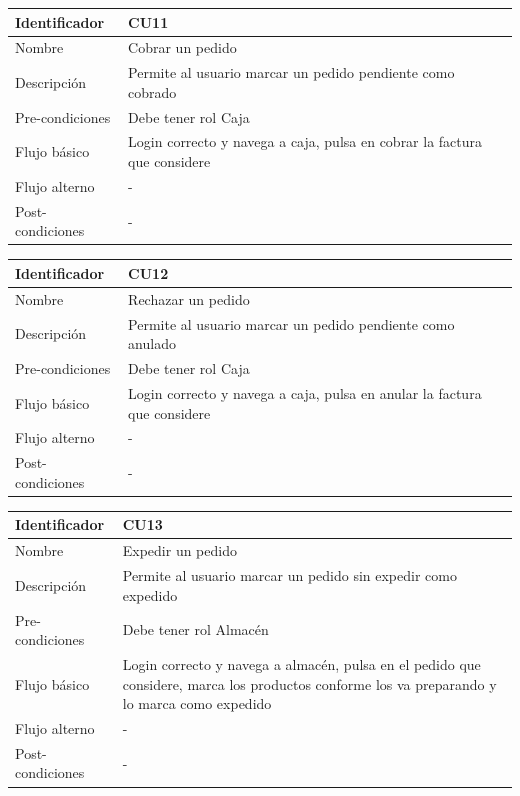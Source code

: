 \vspace{1em}
\par
\begin{tabular}{||p{3cm}|p{11cm}||} 
\hline
Identificador & CU11 \\ [0.5ex] 
\hline\hline
Nombre & Cobrar un pedido \\ 
\hline
Descripción & Permite al usuario marcar un pedido pendiente como cobrado \\
\hline
Pre-condiciones & Debe tener rol Caja \\
\hline
Flujo básico & Login correcto y navega a caja, pulsa en cobrar la factura que considere \\
\hline
Flujo alterno & - \\
\hline
Post-condiciones & - \\
\hline
\end{tabular}

\vspace{1em}
\par
\begin{tabular}{||p{3cm}|p{11cm}||} 
\hline
Identificador & CU12 \\ [0.5ex] 
\hline\hline
Nombre & Rechazar un pedido \\ 
\hline
Descripción & Permite al usuario marcar un pedido pendiente como anulado \\
\hline
Pre-condiciones & Debe tener rol Caja \\
\hline
Flujo básico & Login correcto y navega a caja, pulsa en anular la factura que considere \\
\hline
Flujo alterno & - \\
\hline
Post-condiciones & - \\
\hline
\end{tabular}

\vspace{1em}
\par
\begin{tabular}{||p{3cm}|p{11cm}||} 
\hline
Identificador & CU13 \\ [0.5ex] 
\hline\hline
Nombre & Expedir un pedido \\ 
\hline
Descripción & Permite al usuario marcar un pedido sin expedir como expedido \\
\hline
Pre-condiciones & Debe tener rol Almacén \\
\hline
Flujo básico & Login correcto y navega a almacén, pulsa en el pedido que considere, marca los productos conforme los va preparando y lo marca como expedido \\
\hline
Flujo alterno & - \\
\hline
Post-condiciones & - \\
\hline
\end{tabular}

